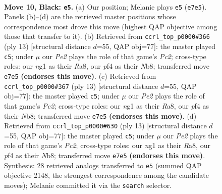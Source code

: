 \documentclass[11pt]{article}
\begin{document}
\clearpage

\begin{figure}[p]\centering
\begin{subfigure}{0.46\textwidth}\centering
\resizebox{\linewidth}{!}{%
\newchessgame
\chessboard[
  setfen={rnbqk2r/pp2p1bp/5pp1/8/3PPPPP/8/P7/R1BQKBNR b KQkq - 0 10},
  showmover=false,
  pgfstyle=straightmove, color=movearrow, markmove={e7-e5}
]}
\caption{}
\end{subfigure}\hfill
\begin{subfigure}{0.46\textwidth}\centering
\resizebox{\linewidth}{!}{%
\newchessgame
\chessboard[
  setfen={rnbqk2r/ppp1ppbp/6p1/8/2BPP3/2P5/P4PPP/R1BQK1NR b KQkq - 2 7},
  showmover=false,
  pgfstyle=straightmove, color=movearrow, markmove={c7-c5}
]}
\caption{}
\end{subfigure}
\\[4pt]
\begin{subfigure}{0.46\textwidth}\centering
\resizebox{\linewidth}{!}{%
\newchessgame
\chessboard[
  setfen={rnbqk2r/ppp1ppbp/6p1/8/2BPP3/2P5/P4PPP/R1BQK1NR b KQkq - 2 7},
  showmover=false,
  pgfstyle=straightmove, color=movearrow, markmove={c7-c5}
]}
\caption{}
\end{subfigure}\hfill
\begin{subfigure}{0.46\textwidth}\centering
\resizebox{\linewidth}{!}{%
\newchessgame
\chessboard[
  setfen={rnbqk2r/ppp1ppbp/6p1/8/2BPP3/2P5/P4PPP/R1BQK1NR b KQkq - 2 7},
  showmover=false,
  pgfstyle=straightmove, color=movearrow, markmove={c7-c5}
]}
\caption{}
\end{subfigure}
\caption{\textbf{Move 10, Black: \texttt{e5}.} (a) Our position; Melanie plays \texttt{e5} (\texttt{e7e5}). Panels (b)--(d) are the retrieved master positions whose correspondence most drove this move (highest QAP objective among those that transfer to it). (b) Retrieved from \texttt{ccrl\_top\_p0000\#366} (ply 13) [structural distance $d$=55, QAP obj=77]: the master played \texttt{c5}; under $\mu$ our \emph{Pe2} plays the role of that game's \emph{Pc2}; cross-type roles: our \emph{n}g1 as their \emph{R}a8, our \emph{p}f4 as their \emph{N}b8; transferred move \texttt{e7e5} \textbf{(endorses this move)}. (c) Retrieved from \texttt{ccrl\_top\_p0000\#367} (ply 13) [structural distance $d$=55, QAP obj=77]: the master played \texttt{c5}; under $\mu$ our \emph{Pe2} plays the role of that game's \emph{Pc2}; cross-type roles: our \emph{n}g1 as their \emph{R}a8, our \emph{p}f4 as their \emph{N}b8; transferred move \texttt{e7e5} \textbf{(endorses this move)}. (d) Retrieved from \texttt{ccrl\_top\_p0000\#630} (ply 13) [structural distance $d$=55, QAP obj=77]: the master played \texttt{c5}; under $\mu$ our \emph{Pe2} plays the role of that game's \emph{Pc2}; cross-type roles: our \emph{n}g1 as their \emph{R}a8, our \emph{p}f4 as their \emph{N}b8; transferred move \texttt{e7e5} \textbf{(endorses this move)}. Synthesis: 28 retrieved analogs transferred to \texttt{e5} (summed QAP objective 2148, the strongest correspondence among the candidate moves); Melanie committed it via the \texttt{search} selector.}
\label{fig:thought-m19}
\end{figure}
\end{document}
